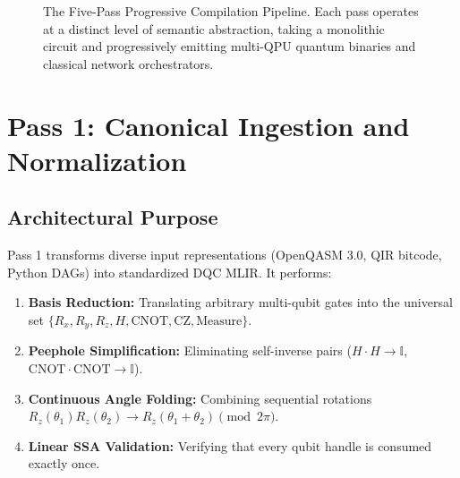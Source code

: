 \begin{figure}[htbp]
    \caption{The Five-Pass Progressive Compilation Pipeline. Each pass operates at a distinct level of semantic abstraction, taking a monolithic circuit and progressively emitting multi-QPU quantum binaries and classical network orchestrators.}
    \label{fig:five_pass_dataflow}
\end{figure}


\section{Pass 1: Canonical Ingestion and Normalization}
\label{sec:pass1_ingestion}

\subsection{Architectural Purpose}
Pass 1 transforms diverse input representations (OpenQASM 3.0, QIR bitcode, Python DAGs) into standardized DQC MLIR. It performs:
\begin{enumerate}
    \item \textbf{Basis Reduction:} Translating arbitrary multi-qubit gates into the universal set $\{R_x, R_y, R_z, H, \text{CNOT}, \text{CZ}, \text{Measure}\}$.
    \item \textbf{Peephole Simplification:} Eliminating self-inverse pairs ($H \cdot H \to \mathbb{I}$, $\text{CNOT} \cdot \text{CNOT} \to \mathbb{I}$).
    \item \textbf{Continuous Angle Folding:} Combining sequential rotations $R_z(\theta_1) R_z(\theta_2) \to R_z(\theta_1 + \theta_2) \pmod{2\pi}$.
    \item \textbf{Linear SSA Validation:} Verifying that every qubit handle is consumed exactly once.
\end{enumerate}

